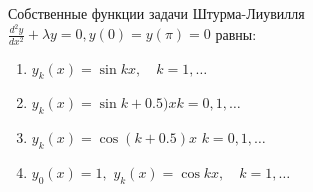 Собственные функции задачи Штурма-Лиувилля \(\frac{d^2y}{dx^2}+\lambda y =0, y\left(0\right)=y\left(\pi \right) =0\) равны:

\begin{enumerate}[label=\arabic*)]
    \item \(y_k\left(x\right)=\sin kx,\quad k=1,\dots\)
    \item \(y_k\left(x\right)=\sin k+0.5)x k=0,1,\dots\)
    \item \(y_k\left(x\right)=\cos (k+0.5)x\) \(k=0,1,\dots\)
    \item \(y_0\left(x\right)=1,\) \(y_k\left(x\right)=\cos kx,\quad k=1,\dots\)
\end{enumerate}

